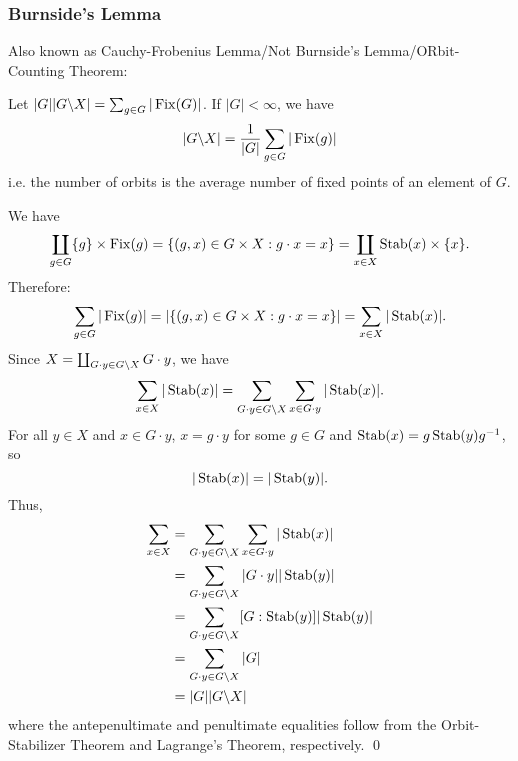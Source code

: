 \documentclass{article}
\renewenvironment{proof}{{\bfseries\color{blue1} Proof:}}{\qed}
\begin{document}
\subsubsection{Burnside's Lemma}
Also known as Cauchy-Frobenius Lemma/Not Burnside's Lemma/ORbit-Counting Theorem:
\begin{idea}
    Let $|G||G\text{\textbackslash} X|=\sum_{g\in G}|\operatorname{Fix}(G)|$. If $|G|<\infty$, we have
    \begin{equation*}
        |G\text{\textbackslash} X| = \frac{1}{|G|}\sum_{g\in G}|\operatorname{Fix}(g)|
    \end{equation*}
    i.e. the number of orbits is the average number of fixed points of an element of $G$.
\end{idea}
\begin{proof}
    We have
    \begin{equation*}
        \coprod_{g\in G}\{g\}\times \operatorname{Fix}(g) = \{(g,x)\in G\times X:g\cdot x=x\} = \coprod_{x\in X}\operatorname{Stab}(x) \times \{x\}.
    \end{equation*}
    Therefore:
    \begin{equation*}
        \sum_{g\in G}|\operatorname{Fix}(g)|=\left|\{(g,x)\in G\times X:g\cdot x=x\}\right|=\sum_{x\in X}|\operatorname{Stab}(x)|.
    \end{equation*}
    Since $X=\coprod_{G\cdot y \in G\text{\textbackslash} X} G\cdot y$, we have
    \begin{equation*}
        \sum_{x\in X}|\operatorname{Stab}(x)| = \sum_{G\cdot y\in G\text{\textbackslash} X}\sum_{x\in G\cdot y}|\operatorname{Stab}(x)|.
    \end{equation*}
    For all $y\in X$ and $x\in G\cdot y$, $x=g\cdot y$ for some $g\in G$ and $\operatorname{Stab}(x)=g\operatorname{Stab}(y)g^{-1}$, so
    \begin{equation*}
        |\operatorname{Stab}(x)|=|\operatorname{Stab}(y)|.
    \end{equation*}
    Thus,
    \begin{align*}
        \sum_{x\in X} &= \sum_{G\cdot y\in G\text{\textbackslash} X}\sum_{x\in G\cdot y}|\operatorname{Stab}(x)| \\ 
        &= \sum_{G\cdot y\in G\text{\textbackslash} X}|G\cdot y| |\operatorname{Stab}(y)| \\
        &= \sum_{G\cdot y\in G\text{\textbackslash} X}[G:\operatorname{Stab}(y)]|\operatorname{Stab}(y)| \\
        &= \sum_{G\cdot y\in G\text{\textbackslash} X} |G| \\ 
        &= |G||G\text{\textbackslash} X|
    \end{align*}
    where the antepenultimate and penultimate equalities follow from the Orbit-Stabilizer Theorem and Lagrange's Theorem, respectively. 
\end{proof}
\end{document}
